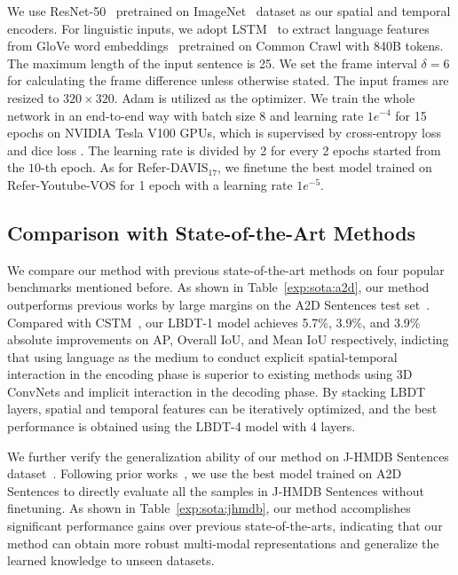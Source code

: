 \documentclass[10pt,twocolumn,letterpaper]{article}
\begin{document}
We use ResNet-50~\cite{He2016CVPR} pretrained on ImageNet~\cite{krizhevsky2012imagenet} dataset as our spatial and temporal encoders. For linguistic inputs, we adopt LSTM~\cite{hochreiter1997long} to extract language features from GloVe word embeddings~\cite{pennington2014glove} pretrained on Common Crawl with 840B tokens. The maximum length of the input sentence is 25. We set the frame interval $\delta=6$ for calculating the frame difference unless otherwise stated. The input frames are resized to $320\times 320$. Adam \cite{kingma2014adam} is utilized as the optimizer. We train the whole network in an end-to-end way with batch size 8 and learning rate $1e^{-4}$ for 15 epochs on NVIDIA Tesla V100 GPUs, which is supervised by cross-entropy loss and dice loss \cite{milletari2016v}. The learning rate is divided by 2 for every 2 epochs started from the $10$-th epoch. As for Refer-DAVIS$_{\text{17}}$, we finetune the best model trained on Refer-Youtube-VOS for 1 epoch with a learning rate $1e^{-5}$.


\subsection{Comparison with State-of-the-Art Methods}

We compare our method with previous state-of-the-art methods on four popular benchmarks mentioned before.
As shown in Table~\ref{exp:sota:a2d}, our method outperforms previous works by large margins on the A2D Sentences test set~\cite{GavrilyukGLS18}. Compared with CSTM~\cite{HuiH0DLWH021}, our LBDT-1 model achieves 5.7\%, 3.9\%, and 3.9\% absolute improvements on AP, Overall IoU, and Mean IoU respectively, indicting that using language as the medium to conduct explicit spatial-temporal interaction in the encoding phase is superior to existing methods using 3D ConvNets and implicit interaction in the decoding phase. By stacking LBDT layers, spatial and temporal features can be iteratively optimized, and the best performance is obtained using the LBDT-4 model with 4 layers.

We further verify the generalization ability of our method on J-HMDB Sentences dataset~\cite{GavrilyukGLS18}.
Following prior works~\cite{HuiH0DLWH021,NingXW020,WangDMY20}, we use the best model trained on A2D Sentences to directly evaluate all the samples in J-HMDB Sentences without finetuning.
As shown in Table~\ref{exp:sota:jhmdb}, our method accomplishes significant performance gains over previous state-of-the-arts, indicating that our method can obtain more robust multi-modal representations and generalize the learned knowledge to unseen datasets.
\end{document}
